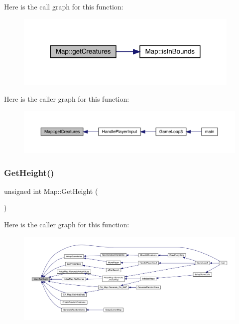Here is the call graph for this function\+:
\nopagebreak
\begin{figure}[H]
\begin{center}
\leavevmode
\includegraphics[width=305pt]{class_map_a5b232a4d35b914192077be84d35f3354_cgraph}
\end{center}
\end{figure}
Here is the caller graph for this function\+:
\nopagebreak
\begin{figure}[H]
\begin{center}
\leavevmode
\includegraphics[width=350pt]{class_map_a5b232a4d35b914192077be84d35f3354_icgraph}
\end{center}
\end{figure}
\mbox{\label{class_map_a5181eaa96c1d125523a2b16d0643bbd5}} 
\subsubsection{\texorpdfstring{Get\+Height()}{GetHeight()}}
{\footnotesize\ttfamily unsigned int Map\+::\+Get\+Height (\begin{DoxyParamCaption}{ }\end{DoxyParamCaption})}

Here is the caller graph for this function\+:
\nopagebreak
\begin{figure}[H]
\begin{center}
\leavevmode
\includegraphics[width=350pt]{class_map_a5181eaa96c1d125523a2b16d0643bbd5_icgraph}
\end{center}
\end{figure}
\mbox{\label{class_map_a5070fd388ce6f5ab71dd63475e28302c}} 
